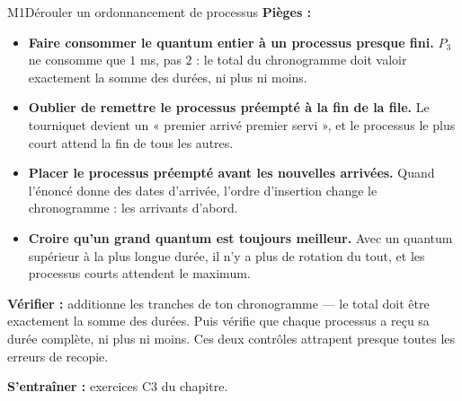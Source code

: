 \begin{fichemethode}{M1}{Dérouler un ordonnancement de processus}
\textbf{Pièges :}
\begin{itemize}
  \item \textbf{Faire consommer le quantum entier à un processus presque fini.} $P_3$ ne
    consomme que $1$ ms, pas $2$ : le total du chronogramme doit valoir exactement la somme
    des durées, ni plus ni moins.
  \item \textbf{Oublier de remettre le processus préempté à la fin de la file.} Le tourniquet
    devient un « premier arrivé premier servi », et le processus le plus court attend la fin
    de tous les autres.
  \item \textbf{Placer le processus préempté avant les nouvelles arrivées.} Quand l'énoncé
    donne des dates d'arrivée, l'ordre d'insertion change le chronogramme : les arrivants
    d'abord.
  \item \textbf{Croire qu'un grand quantum est toujours meilleur.} Avec un quantum supérieur à
    la plus longue durée, il n'y a plus de rotation du tout, et les processus courts attendent
    le maximum.
\end{itemize}

\textbf{Vérifier :} additionne les tranches de ton chronogramme — le total doit être
exactement la somme des durées. Puis vérifie que chaque processus a reçu sa durée complète,
ni plus ni moins. Ces deux contrôles attrapent presque toutes les erreurs de recopie.

\textbf{S'entraîner :} exercices C3 du chapitre.
\end{fichemethode}
